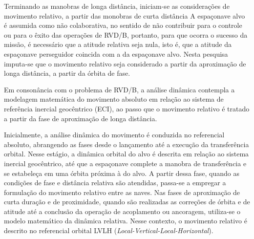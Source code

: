 
Terminando as manobras de longa distância, iniciam-se as considerações de movimento relativo, a partir das monobras de curta distância
A espaçonave alvo é assumida como não colaborativa, no sentido de não contribuir para o controle ou para o êxito das operações de RVD/B, portanto, para que ocorra o sucesso da missão, é necessário que a atitude relativa seja nula, isto é, que a atitude da espaçonave perseguidor coincida com a da espaçonave alvo.
Nesta pesquisa imputa-se que o movimento relativo seja considerado a partir da aproximação de longa distância, a partir da órbita de fase.

Em consonância com o problema de RVD/B, a análise dinâmica contempla a modelagem matemática do movimento absoluto em relação ao sistema de referência inercial geocêntrico (ECI), ao passo que o movimento relativo é tratado a partir da fase de aproximação de longa distância.


Inicialmente, a análise dinâmica do movimento é conduzida no referencial absoluto, abrangendo as fases desde o lançamento até a execução da transferência orbital. Nesse estágio, a dinâmica orbital do alvo é descrita em relação ao sistema inercial geocêntrico, até que a espaçonave complete a manobra de transferência e se estabeleça em uma órbita próxima à do alvo.
A partir dessa fase, quando as condições de fase e distância relativa são atendidas, passa-se a empregar a formulação do movimento relativo entre as naves.
Nas fases de aproximação de curta duração e de proximidade, quando são realizadas as correções de órbita e de atitude até a conclusão da operação de acoplamento ou ancoragem, utiliza-se o modelo matemático da dinâmica relativa.
Nesse contexto, o movimento relativo é descrito no referencial orbital LVLH (\emph{Local-Vertical-Local-Horizontal}).


